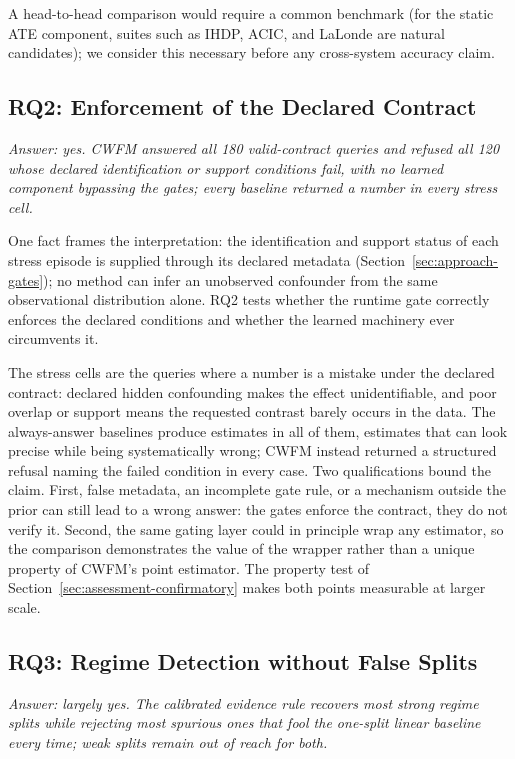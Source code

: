 \documentclass[electronics,article,submit,oneauthor]{Definitions/mdpi}
\begin{document}
A head-to-head comparison would require a common benchmark (for the static ATE component, suites such as IHDP, ACIC, and LaLonde are natural candidates); we consider this necessary before any cross-system accuracy claim.

\subsection{RQ2: Enforcement of the Declared Contract}\label{sec:assessment-rq2}

\emph{Answer: yes. CWFM answered all 180 valid-contract queries and refused all 120 whose declared identification or support conditions fail, with no learned component bypassing the gates; every baseline returned a number in every stress cell.}

One fact frames the interpretation: the identification and support status of each stress episode is supplied through its declared metadata (Section~\ref{sec:approach-gates}); no method can infer an unobserved confounder from the same observational distribution alone. RQ2 tests whether the runtime gate correctly enforces the declared conditions and whether the learned machinery ever circumvents it.

The stress cells are the queries where a number is a mistake under the declared contract: declared hidden confounding makes the effect unidentifiable, and poor overlap or support means the requested contrast barely occurs in the data. The always-answer baselines produce estimates in all of them, estimates that can look precise while being systematically wrong; CWFM instead returned a structured refusal naming the failed condition in every case. Two qualifications bound the claim. First, false metadata, an incomplete gate rule, or a mechanism outside the prior can still lead to a wrong answer: the gates enforce the contract, they do not verify it. Second, the same gating layer could in principle wrap any estimator, so the comparison demonstrates the value of the wrapper rather than a unique property of CWFM's point estimator. The property test of Section~\ref{sec:assessment-confirmatory} makes both points measurable at larger scale.

\subsection{RQ3: Regime Detection without False Splits}\label{sec:assessment-rq3}

\emph{Answer: largely yes. The calibrated evidence rule recovers most strong regime splits while rejecting most spurious ones that fool the one-split linear baseline every time; weak splits remain out of reach for both.}
\end{document}

